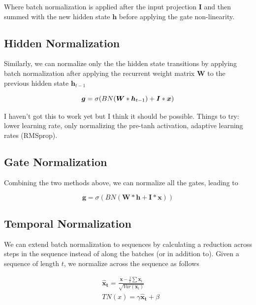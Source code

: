 \documentclass{article}
\begin{document}
Where batch normalization is applied after the input projection $\boldsymbol I$ and then summed with the new hidden state $\boldsymbol h$ before applying the gate non-linearity.

\subsection{Hidden Normalization} Similarly, we can normalize only the the hidden state transitions by applying batch normalization after applying the recurrent weight matrix $\boldsymbol W$ to the previous hidden state $\boldsymbol h_{t-1}$

\begin{equation}
	\boldsymbol g = \sigma(BN(\boldsymbol W * \boldsymbol h_{t-1}) + \boldsymbol I * \boldsymbol x) \\
\end{equation}

I haven't got this to work yet but I think it should be possible. Things to try: lower learning rate, only normalizing the pre-tanh activation, adaptive learning rates (RMSprop). 

\subsection{Gate Normalization} Combining the two methods above, we can normalize all the gates, leading to 

\begin{equation}
	\boldsymbol g = \sigma(BN(\boldsymbol W * \boldsymbol h + \boldsymbol I * \boldsymbol x)) \nonumber
\end{equation}

\subsection{Temporal Normalization}
We can extend batch normalization to sequences by calculating a reduction across steps in the sequence instead of along the batches (or in addition to). Given a sequence of length $t$, we normalize across the sequence as follows

\begin{equation}
	\begin{split}
		& \boldsymbol{\hat x_t} = \frac{\boldsymbol x - \frac{1}{t} \sum \boldsymbol x_t}{\sqrt{Var(\boldsymbol x_t)}} \\
		& TN(x) = \gamma \boldsymbol{\hat x_t} + \beta
	\end{split}
\end{equation}
\end{document}
